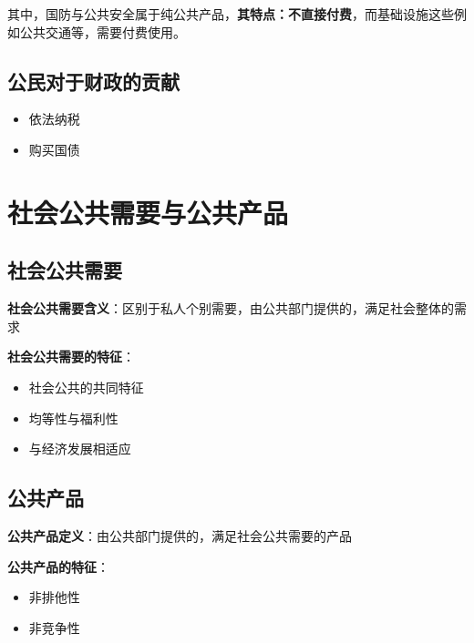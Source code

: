 \documentclass[
]{book}
\providecommand{\tightlist}{%
  \setlength{\itemsep}{0pt}\setlength{\parskip}{0pt}}
\theoremstyle{definition}
\theoremstyle{definition}
\theoremstyle{definition}
\theoremstyle{definition}
\theoremstyle{remark}
\begin{document}
其中，国防与公共安全属于纯公共产品，\textbf{其特点：不直接付费}，而基础设施这些例如公共交通等，需要付费使用。

\hypertarget{ux516cux6c11ux5bf9ux4e8eux8d22ux653fux7684ux8d21ux732e}{%
\subsection{公民对于财政的贡献}\label{ux516cux6c11ux5bf9ux4e8eux8d22ux653fux7684ux8d21ux732e}}

\begin{itemize}
\tightlist
\item
  依法纳税
\item
  购买国债
\end{itemize}

\hypertarget{ux793eux4f1aux516cux5171ux9700ux8981ux4e0eux516cux5171ux4ea7ux54c1}{%
\section{社会公共需要与公共产品}\label{ux793eux4f1aux516cux5171ux9700ux8981ux4e0eux516cux5171ux4ea7ux54c1}}

\hypertarget{ux793eux4f1aux516cux5171ux9700ux8981}{%
\subsection{社会公共需要}\label{ux793eux4f1aux516cux5171ux9700ux8981}}

\textbf{社会公共需要含义}：区别于私人个别需要，由公共部门提供的，满足社会整体的需求

\textbf{社会公共需要的特征}：

\begin{itemize}
\tightlist
\item
  社会公共的共同特征
\item
  均等性与福利性
\item
  与经济发展相适应
\end{itemize}

\hypertarget{ux516cux5171ux4ea7ux54c1}{%
\subsection{公共产品}\label{ux516cux5171ux4ea7ux54c1}}

\textbf{公共产品定义}：由公共部门提供的，满足社会公共需要的产品

\textbf{公共产品的特征}：

\begin{itemize}
\tightlist
\item
  非排他性
\item
  非竞争性
\end{itemize}
\end{document}
